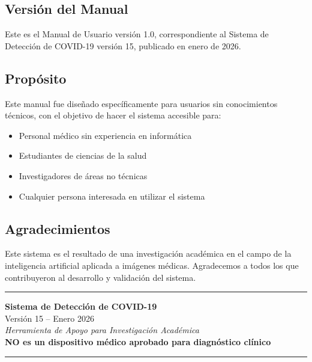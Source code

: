 \documentclass[12pt,a4paper]{article}
\begin{document}
\subsection*{Versión del Manual}
Este es el Manual de Usuario versión 1.0, correspondiente al Sistema de Detección de COVID-19 versión 15, publicado en enero de 2026.

\subsection*{Propósito}
Este manual fue diseñado específicamente para usuarios sin conocimientos técnicos, con el objetivo de hacer el sistema accesible para:
\begin{itemize}[leftmargin=*]
    \item Personal médico sin experiencia en informática
    \item Estudiantes de ciencias de la salud
    \item Investigadores de áreas no técnicas
    \item Cualquier persona interesada en utilizar el sistema
\end{itemize}

\subsection*{Agradecimientos}
Este sistema es el resultado de una investigación académica en el campo de la inteligencia artificial aplicada a imágenes médicas. Agradecemos a todos los que contribuyeron al desarrollo y validación del sistema.

\vspace{1cm}

\begin{center}
\rule{0.5\textwidth}{0.5pt}
\end{center}

\vspace{0.5cm}

\begin{center}
\textbf{Sistema de Detección de COVID-19}\\
Versión 15 -- Enero 2026\\[0.3cm]
\textit{Herramienta de Apoyo para Investigación Académica}\\[0.3cm]
\textbf{NO es un dispositivo médico aprobado para diagnóstico clínico}
\end{center}

\vspace{1cm}

\begin{center}
\rule{0.5\textwidth}{0.5pt}
\end{center}
\end{document}
